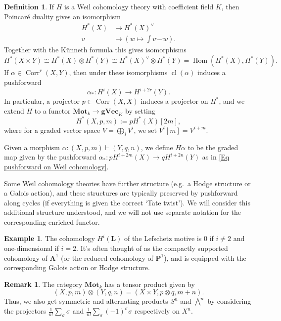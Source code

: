 \documentclass[11pt]{amsart}
\theoremstyle{definition}
\newtheorem{Rmk}[Thm]{Remark}
\newtheorem{Def}[Thm]{Definition}
\newtheorem{Ex}[Thm]{Example}
\renewcommand{\L}{\mathbf L}
\newcommand{\A}{\mathbf A}
\renewcommand{\P}{\mathbf P}
\newcommand{\Hom}{\operatorname{Hom}}
\newcommand{\cl}{\operatorname{cl}}
\newcommand{\tens}{\otimes}
\newcommand{\Corr}{\operatorname{Corr}}
\newcommand{\cto}{\vdash}
\newcommand{\rA}{\longrightarrow}
\newcommand{\gVec}{\mathbf{gVec}}
\newcommand{\M}{\mathbf{Mot}}
\begin{document}
\begin{Def}\label{Def pushforward on Weil cohomology}
If $H$ is a Weil cohomology theory with coefficient field $K$, then
Poincar\'e duality gives an isomorphism
\begin{align}
H^*(X) &\rA H^*(X)^\vee\label{Eq Poincare duality}\\
v &\longmapsto \left(w \mapsto \int v \smile w\right).\nonumber %
\end{align}
Together with the K\"unneth formula this gives isomorphisms
\[
H^*(X \times Y) \cong H^*(X) \tens H^*(Y) \cong H^*(X)^\vee \tens
H^*(Y) = \Hom(H^*(X),H^*(Y)).
\]
If $\alpha \in \Corr^r(X,Y)$, then under these isomorphisms
$\cl(\alpha)$ induces a pushforward
\begin{equation}
\alpha_* \colon H^i(X) \to H^{i+2r}(Y).\label{Eq pushforward on Weil
cohomology}
\end{equation}
In particular, a projector $p \in \Corr(X,X)$ induces a projector on
$H^*$, and we extend $H$ to a functor $\M_k \to \gVec_K$ by setting
\[
H^*(X,p,m) := pH^*(X)[2m],
\]
where for a graded vector space $V = \bigoplus_i V^i$, we set
$V^i[m] = V^{i+m}$.\pagebreak

Given a morphism $\alpha \colon (X,p,m) \cto (Y,q,n)$, we define
$H\alpha$ to be the graded map given by the pushforward $\alpha_*
\colon pH^{i+2m}(X) \to qH^{i+2n}(Y)$ as in \eqref{Eq pushforward on
Weil cohomology}.

Some Weil cohomology theories have further structure (e.g.\ a Hodge
structure or a Galois action), and these structures are typically
preserved by pushforward along cycles (if everything is given the
correct `Tate twist'). We will consider this additional structure
understood, and we will not use separate notation for the
corresponding enriched functor.
\end{Def}

\begin{Ex}
The cohomology $H^i(\L)$ of the Lefschetz motive is $0$ if $i \neq
2$ and one-dimensional if $i = 2$. It's often thought of as the
compactly supported cohomology of $\A^1$ (or the reduced cohomology
of $\P^1$), and is equipped with the corresponding Galois action or
Hodge structure.
\end{Ex}

\begin{Rmk}\label{Rmk tensor product}
The category $\M_k$ has a tensor product given by
\[
(X,p,m) \tens (Y,q,n) = (X \times Y, p \tens q, m+n).
\]
Thus, we also get symmetric and alternating products $S^n$ and
$\bigwedge^n$ by considering the projectors $\frac{1}{n!}
\sum_\sigma \sigma$ and $\frac{1}{n!} \sum_\sigma (-1)^\sigma
\sigma$ respectively on $X^n$.
\end{Rmk}
\end{document}
